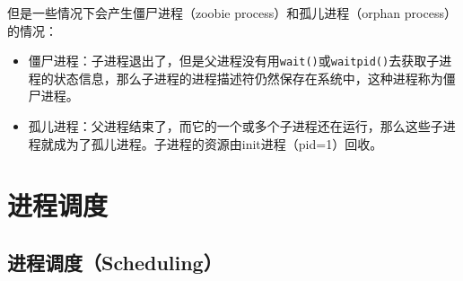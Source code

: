 但是一些情况下会产生僵尸进程（zoobie process）和孤儿进程（orphan process）的情况：

\begin{itemize}
	\item 僵尸进程：子进程退出了，但是父进程没有用\lstinline|wait()|或\lstinline|waitpid()|去获取子进程的状态信息，那么子进程的进程描述符仍然保存在系统中，这种进程称为僵尸进程。
	
	\item 孤儿进程：父进程结束了，而它的一个或多个子进程还在运行，那么这些子进程就成为了孤儿进程。子进程的资源由init进程（pid=1）回收。
\end{itemize}

\newpage

\section{进程调度}

\subsection{进程调度（Scheduling）}

